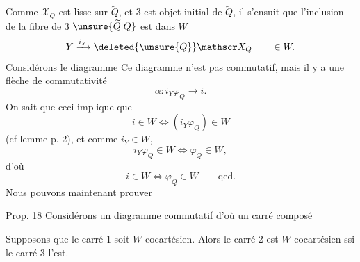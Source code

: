 Comme $\mathscr X_Q$ est lisse sur $\widetilde Q$, et 3 est objet initial de $\widetilde Q$, il s'ensuit que l'inclusion de la fibre de  $3$  $\unsure{\widetilde Q|Q}$ est dans $W$
\[
 Y\xrightarrow{i_Y}\deleted{\unsure{Q}}\mathscr X_Q\qquad\in W.
\]
Considérons  le diagramme
Ce diagramme n'est pas commutatif, mais il y a une flèche de commutativité
\[
 \alpha:i_Y\varphi_Q\longrightarrow i.
\]
On sait que ceci implique que 
\[
 i\in W \Longleftrightarrow (i_Y\varphi_Q)\in W
\]
(cf lemme p. 2), et comme $i_Y\in W$, 
\[
 i_Y\varphi_Q\in W\Longleftrightarrow\varphi_Q\in W,
\]
d'où
\[
 i\in W\Longleftrightarrow\varphi_Q\in W\qquad \text{qed.}
\]
Nous pouvons maintenant prouver



\uline{Prop. 18}  Considérons un diagramme commutatif
d'où un carré composé

Supposons que le carré 1 soit $W$-cocartésien. Alors le carré 2 est $W$-cocartésien ssi le carré 3 l'est.

